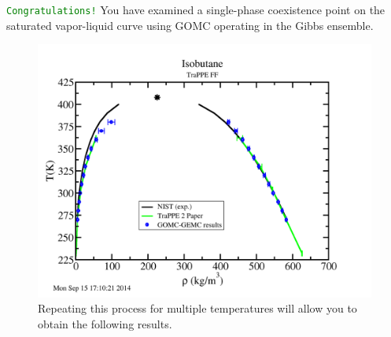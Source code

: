 \textcolor{green}{\texttt{Congratulations!}} You have examined a single-phase coexistence point on the saturated vapor-liquid curve using GOMC operating in the Gibbs ensemble.
\begin{figure}[H]
\centering
\includegraphics[scale=0.5]{images/isobutane_result}
\caption{Repeating this process for multiple temperatures will allow you to obtain the following results.}
\end{figure}














